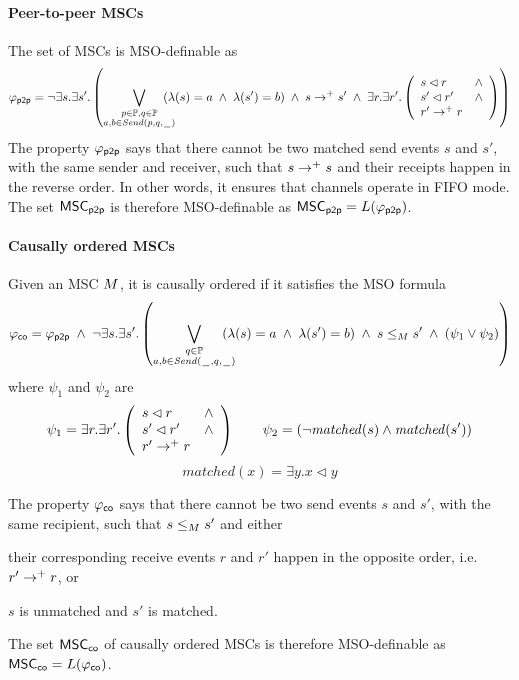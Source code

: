 \documentclass{article}
\begin{document}
\paragraph*{Peer-to-peer MSCs}
	The set of \pp MSCs is MSO-definable as
	\[
		\varphi_{\mathsf{p2p}} = \neg \exists s.\exists s'. \left(
		\bigvee_{\substack{p \in \mathbb{P}, q \in \mathbb{P}\\a,b \in {\mathit{Send}(p,q,\hspace{0.1em}\underline{\hspace{0.5em}}\hspace{0.1em})}}}\hspace{-1em}
		(\lambda(s) = a \;\wedge\; \lambda(s') = b) \;\wedge\; s \to^+ s' \;\wedge\;
		\exists r.\exists r'.\left(
		\begin{array}{ll}
			s \lhd r & \wedge\\
			s' \lhd r' & \wedge\\
			r' \to^+ r &
		\end{array}
		\right)
		\right)
	\]
The property $\varphi_{\mathsf{p2p}}$ says that there cannot be two matched send events $s$ and $s'$, with the same sender and receiver, such that $s \to^+ s$ and their receipts happen in the reverse order. In other words, it ensures that channels operate in FIFO mode.
The set $\mathsf{MSC}_{\mathsf{p2p}}$ is therefore MSO-definable as $\mathsf{MSC}_{\mathsf{p2p}}=L(\varphi_{\mathsf{p2p}})$.

\paragraph*{Causally ordered MSCs}

Given an MSC $M$, it is causally ordered if it satisfies the MSO formula
\[
\varphi_{\mathsf{co}} = \varphi_{\mathsf{p2p}} \;\wedge\; 
\neg \exists s.\exists s'. \left(
\bigvee_{\substack{q \in \mathbb{P}\\a,b \in {\mathit{Send}(\hspace{0.1em}\underline{\hspace{0.5em}}\hspace{0.1em},q,\hspace{0.1em}\underline{\hspace{0.5em}}\hspace{0.1em})}}}\hspace{-1em}
(\lambda(s) = a \;\wedge\; \lambda(s') = b)
\;\wedge\; s \le_M s' \;\wedge\;
(\psi_1 \vee \psi_2 ) 
\right)
\]
where $\psi_1$ and $\psi_2$ are
\[
\psi_1 = \exists r.\exists r'.\left(
\begin{array}{ll}
	s \lhd r & \wedge\\
	s' \lhd r' & \wedge\\
	r' \to^+ r &
\end{array} 
\right) \quad \quad
\psi_2 = (\neg \mathit{matched}(s) \wedge \mathit{matched}(s'))
\]
\[
matched(x) = \exists y. x \lhd y
\]

The property $\varphi_{\mathsf{co}}$ says that there cannot be two send events $s$ and $s'$, with the same recipient, such that $s \le_M s'$ and either
\begin{enumerate*}[label={(\roman*)}]
	\item their corresponding receive events $r$ and $r'$ happen in the opposite order, i.e. $r' \to^+ r$, or
	\item $s$ is unmatched and $s'$ is matched.
\end{enumerate*}
The set $\mathsf{MSC}_{\mathsf{co}}$ of causally ordered MSCs is therefore MSO-definable as $\mathsf{MSC}_{\mathsf{co}}=L(\varphi_{\mathsf{co}})$.
\end{document}
